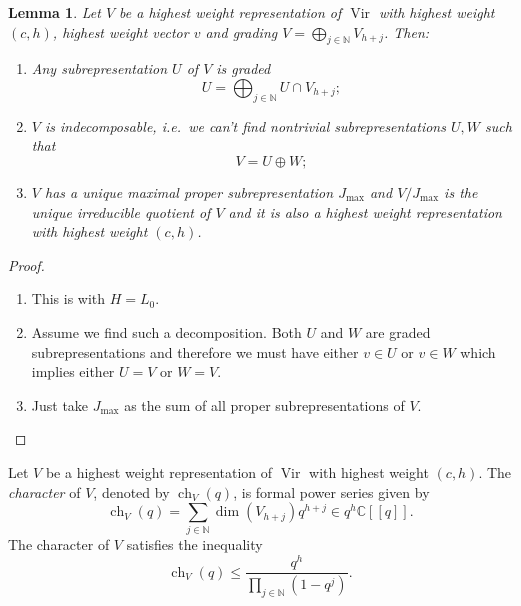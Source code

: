 \documentclass[a4paper, 12pt, reqno]{amsart}
\newtheorem{lemma}[theorem]{Lemma}
\theoremstyle{remark}
\numberwithin{equation}{subsection}
\DeclareMathOperator{\Vir}{Vir}
\DeclareMathOperator{\ch}{ch}
\begin{document}
\begin{lemma}
  \label{lmm:16}
  Let $V$ be a highest weight representation of $\Vir$ with highest weight $(c, h)$, highest weight vector $v$ and grading $V = \bigoplus_{j \in \mathbb{N}}V_{h + j}$.
  Then:
  \begin{enumerate}
  \item Any subrepresentation $U$ of $V$ is graded
    \begin{equation*}
      U = \bigoplus_{j \in \mathbb{N}}U \cap V_{h + j};
    \end{equation*}
  \item $V$ is indecomposable, i.e.\ we can't find nontrivial subrepresentations $U, W$ such that
    \begin{equation*}
      V = U \oplus W;
    \end{equation*}
  \item $V$ has a unique maximal proper subrepresentation $J_{\max}$ and $V/J_{\max}$ is the unique irreducible quotient of $V$ and it is also a highest weight representation with highest weight $(c, h)$.
  \end{enumerate}
\end{lemma}

\begin{proof}\leavevmode
  \begin{enumerate}
  \item This is  with $H = L_0$.
  \item Assume we find such a decomposition.
    Both $U$ and $W$ are graded subrepresentations and therefore we must have either $v \in U$ or $v \in W$ which implies either $U = V$ or $W = V$.
  \item Just take $J_{\max}$ as the sum of all proper subrepresentations of $V$. \qedhere
  \end{enumerate}
\end{proof}

Let $V$ be a highest weight representation of $\Vir$ with highest weight $(c, h)$.
The \emph{character} of $V$, denoted by $\ch_V(q)$, is formal power series given by
\begin{equation*}
  \ch_V(q) = \sum_{j \in \mathbb{N}}\dim(V_{h + j})q^{h + j} \in q^h\mathbb{C}[[q]].
\end{equation*}
The character of $V$ satisfies the inequality
\begin{equation*}
  \ch_V(q) \le \frac{q^h}{\prod_{j \in \mathbb{N}}(1 - q^j)}.
\end{equation*}
\end{document}
